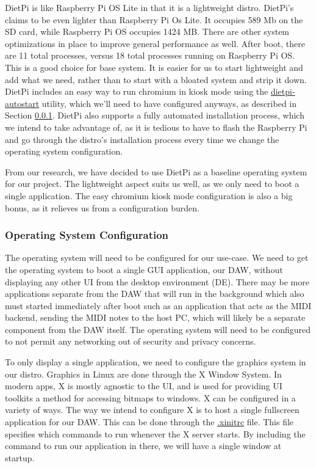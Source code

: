 DietPi is like Raspberry Pi OS Lite in that it is a lightweight distro. DietPi's claims to
be even lighter than Raspberry Pi Os Lite. It occupies 589 Mb on the SD card, while
Raspberry Pi OS occupies 1424 MB. There are other system optimizations in place to improve
general performance as well. After boot, there are 11 total processes, versus 18 total
processes running on Raspberry Pi OS. This is a good choice for base system. It is easier
for us to start lightweight and add what we need, rather than to start with a bloated
system and strip it down. DietPi includes an easy way to run chromium in kiosk mode using
the \url{dietpi-autostart} utility, which we'll need to have configured anyways, as
described in Section \ref{sec:research:subsec:os_config}. DietPi also supports a fully
automated installation process, which we intend to take advantage of, as it is tedious to
have to flash the Raspberry Pi and go through the distro's installation process every time
we change the operating system configuration.

From our research, we have decided to use DietPi as a baseline operating system for our
project. The lightweight aspect suits us well, as we only need to boot a single
application. The easy chromium kiosk mode configuration is also a big bonus, as it
relieves us from a configuration burden.

\subsubsection{Operating System Configuration}
\label{sec:research:subsec:os_config}

The operating system will need to be configured for our use-case. We need to get the
operating system to boot a single GUI application, our DAW, without displaying any other
UI from the desktop environment (DE). There may be more applications separate from the DAW
that will run in the background which also must started immediately after boot such as an
application that acts as the MIDI backend, sending the MIDI notes to the host PC, which
will likely be a separate component from the DAW itself. The operating system will need to
be configured to not permit any networking out of security and privacy concerns.

To only display a single application, we need to configure the graphics system in our
distro. Graphics in Linux are done through the X Window System. In modern apps, X is
mostly agnostic to the UI, and is used for providing UI toolkits a method for accessing
bitmaps to windows. X can be configured in a variety of ways. The way we intend to
configure X is to host a single fullscreen application for our DAW. This can be done
through the \url{.xinitrc} file. This file specifies which commands to run whenever the X
server starts. By including the command to run our application in there, we will have a
single window at startup.


